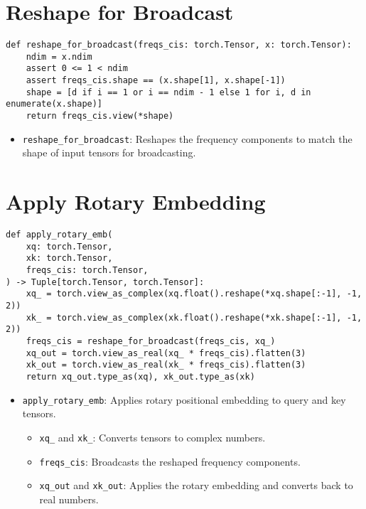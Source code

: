 \section{Reshape for Broadcast}

\begin{lstlisting}
def reshape_for_broadcast(freqs_cis: torch.Tensor, x: torch.Tensor):
    ndim = x.ndim
    assert 0 <= 1 < ndim
    assert freqs_cis.shape == (x.shape[1], x.shape[-1])
    shape = [d if i == 1 or i == ndim - 1 else 1 for i, d in enumerate(x.shape)]
    return freqs_cis.view(*shape)
\end{lstlisting}

\begin{itemize}
    \item \texttt{reshape\_for\_broadcast}: Reshapes the frequency components to match the shape of input tensors for broadcasting.
\end{itemize}

\section{Apply Rotary Embedding}

\begin{lstlisting}
def apply_rotary_emb(
    xq: torch.Tensor,
    xk: torch.Tensor,
    freqs_cis: torch.Tensor,
) -> Tuple[torch.Tensor, torch.Tensor]:
    xq_ = torch.view_as_complex(xq.float().reshape(*xq.shape[:-1], -1, 2))
    xk_ = torch.view_as_complex(xk.float().reshape(*xk.shape[:-1], -1, 2))
    freqs_cis = reshape_for_broadcast(freqs_cis, xq_)
    xq_out = torch.view_as_real(xq_ * freqs_cis).flatten(3)
    xk_out = torch.view_as_real(xk_ * freqs_cis).flatten(3)
    return xq_out.type_as(xq), xk_out.type_as(xk)
\end{lstlisting}

\begin{itemize}
    \item \texttt{apply\_rotary\_emb}: Applies rotary positional embedding to query and key tensors.
    \begin{itemize}
        \item \texttt{xq\_} and \texttt{xk\_}: Converts tensors to complex numbers.
        \item \texttt{freqs\_cis}: Broadcasts the reshaped frequency components.
        \item \texttt{xq\_out} and \texttt{xk\_out}: Applies the rotary embedding and converts back to real numbers.
    \end{itemize}
\end{itemize}

